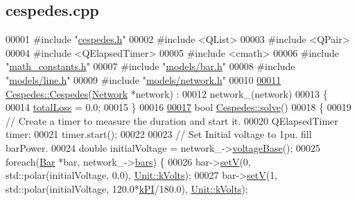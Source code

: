 \hypertarget{cespedes_8cpp_source}{}\subsection{cespedes.\+cpp}
\label{cespedes_8cpp_source}

\begin{DoxyCode}
00001 \textcolor{preprocessor}{#include "\hyperlink{cespedes_8h}{cespedes.h}"}
00002 \textcolor{preprocessor}{#include <QList>}
00003 \textcolor{preprocessor}{#include <QPair>}
00004 \textcolor{preprocessor}{#include <QElapsedTimer>}
00005 \textcolor{preprocessor}{#include <cmath>}
00006 \textcolor{preprocessor}{#include "\hyperlink{math__constants_8h}{math\_constants.h}"}
00007 \textcolor{preprocessor}{#include "\hyperlink{bar_8h}{models/bar.h}"}
00008 \textcolor{preprocessor}{#include "\hyperlink{line_8h}{models/line.h}"}
00009 \textcolor{preprocessor}{#include "\hyperlink{network_8h}{models/network.h}"}
00010 
\hypertarget{cespedes_8cpp_source_l00011}{}\hyperlink{class_cespedes_ad0b43c0c5ea7935c8dcb4dcf3d79ff7c}{00011} \hyperlink{class_cespedes_ad0b43c0c5ea7935c8dcb4dcf3d79ff7c}{Cespedes::Cespedes}(\hyperlink{class_network}{Network} *network) :
00012   network\_(network)
00013 \{
00014   \hyperlink{class_cespedes_ae1a95c3c22fff9c230fd528d9b191966}{totalLoss} = 0.0;
00015 \}
00016 
\hypertarget{cespedes_8cpp_source_l00017}{}\hyperlink{class_cespedes_a067d624d68effc0eced09b18f2a16fc0}{00017} \textcolor{keywordtype}{bool} \hyperlink{class_cespedes_a067d624d68effc0eced09b18f2a16fc0}{Cespedes::solve}()
00018 \{
00019   \textcolor{comment}{// Create a timer to measure the duration and start it.}
00020   QElapsedTimer timer;
00021   timer.start();
00022 
00023   \textcolor{comment}{// Set Initial voltage to 1pu. fill barPower.}
00024   \textcolor{keywordtype}{double} initialVoltage = network\_->\hyperlink{group___models_ga88cd2506aaf0b19513e41f00608093e0}{voltageBase}();
00025   \textcolor{keywordflow}{foreach}(\hyperlink{class_bar}{Bar} *bar, network\_->\hyperlink{class_network_ae37a8418e42adf765b143cdc9d992b6c}{bars}) \{
00026     bar->\hyperlink{group___models_ga8d1e70b2d11ed4245e81b8b20858079d}{setV}(0, std::polar(initialVoltage, 0.0), \hyperlink{class_unit_a55b07dfa9457e1eca2c7194fe0cfc3c1aa54b2473993a702a3923525765bd6e4c}{Unit::kVolts});
00027     bar->\hyperlink{group___models_ga8d1e70b2d11ed4245e81b8b20858079d}{setV}(1, std::polar(initialVoltage, 120.0*\hyperlink{math__constants_8h_a368d99984512d9a6c6f18b37b4446431}{kPI}/180.0), 
      \hyperlink{class_unit_a55b07dfa9457e1eca2c7194fe0cfc3c1aa54b2473993a702a3923525765bd6e4c}{Unit::kVolts});

\end{DoxyCode}
